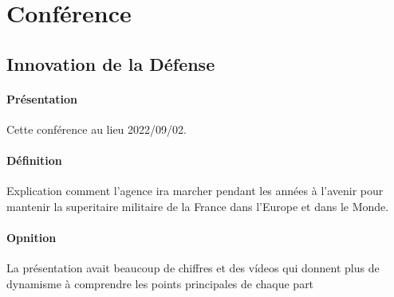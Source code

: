 \documentclass{article}
\begin{document}



















\newpage\section{Conférence}
\subsection{Innovation de la Défense}
\paragraph{Présentation} Cette conférence au lieu 2022/09/02.

\paragraph{Définition}Explication comment l'agence ira marcher pendant les années à l'avenir pour mantenir la superitaire militaire de la France dans l'Europe et dans le Monde.

\paragraph{Opnition}La présentation avait beaucoup de chiffres et des vídeos qui donnent plus de dynamisme à comprendre les points principales de chaque part
\end{document}
